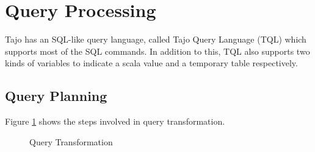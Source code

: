 \documentclass[9pt,twocolumn,twoside]{../../styles/osajnl}
\begin{document}
\section{Query Processing}
Tajo has an SQL-like query language, called
\cite{www-apache-tajo-tsql} Tajo Query Language (TQL) which supports
most of the SQL commands. In addition to this, TQL also supports two
kinds of variables to indicate a scala value and a temporary table
respectively.

\subsection{Query Planning}

Figure \ref{fig:queryplanning} shows the steps involved in query transformation. 

\begin{figure}[htbp]
\centering
{}
\caption{\cite{tajo-paper} Query Transformation}
\label{fig:queryplanning}
\end{figure}
\end{document}
